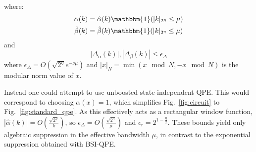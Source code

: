 \documentclass[aps,floatfix,10pt,amssymb,amsfont,amsmath,superscriptaddress,float,nofootinbib,longbibliography,nobalancelastpage,twocolumn]{revtex4-2}
\begin{document}
where:
\begin{align}
    \tilde\alpha(k) &= \hat\alpha(k)\mathbbm{1}(|k|_{2^{\eta}}\leq \mu)\\
    \tilde\beta(k) &= \hat\beta(k)\mathbbm{1}(|k|_{2^{\eta}}\leq \mu)
    \label{eq:decomposealpha2}
\end{align}  and
\begin{equation}
    |\Delta_\alpha(k)|,|\Delta_\beta(k)|\leq \epsilon_{\Delta}
    \label{eq:decomposealpha3}
\end{equation} where $\epsilon_{\Delta} = O(\sqrt{2^{\eta}}e^{-\nu \mu})$ and $|x|_N = \min(x \mod N,- x\mod N)$ is the modular norm value of $x$.


Instead one could attempt to use unboosted state-independent QPE. This would correspond to choosing $\alpha(x)=1$, which simplifies Fig.~\ref{fig:circuit} to Fig.~\ref{fig:standard_qpe}. As this effectively acts as a rectangular window function, $|\hat\alpha(k)| = O(\frac{\sqrt{2^{\eta}}}{k})$, so $\epsilon_{\Delta} = O(\frac{\sqrt{2^{\eta}}}{\mu})$ and $\epsilon_r = 2^{1-\frac{\eta}{2}}$. These bounds yield only algebraic suppression in the effective bandwidth $\mu$, in contrast to the exponential suppression obtained with BSI-QPE.
\end{document}
